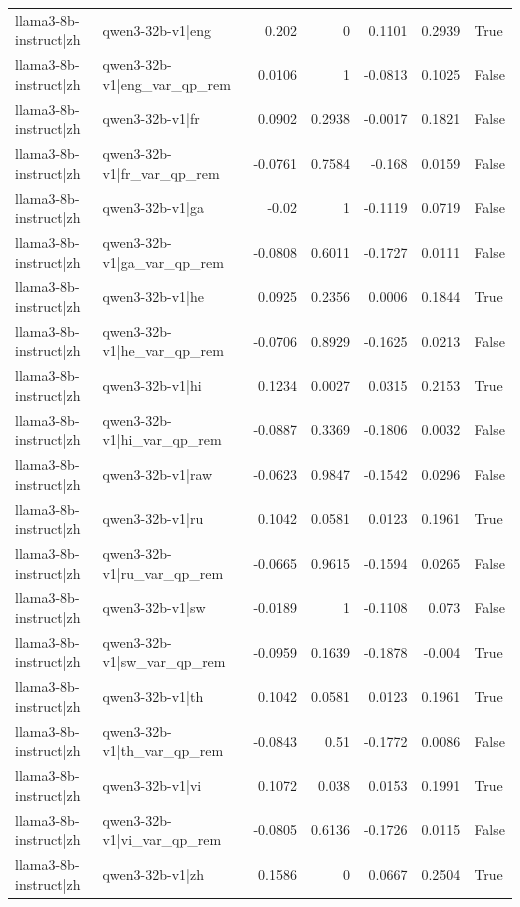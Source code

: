 \begin{table}
\begin{tabular}{l l r r r r l}
llama3-8b-instruct|zh & qwen3-32b-v1|eng & 0.202 & 0 & 0.1101 & 0.2939 & True \\
llama3-8b-instruct|zh & qwen3-32b-v1|eng_var_qp_rem & 0.0106 & 1 & -0.0813 & 0.1025 & False \\
llama3-8b-instruct|zh & qwen3-32b-v1|fr & 0.0902 & 0.2938 & -0.0017 & 0.1821 & False \\
llama3-8b-instruct|zh & qwen3-32b-v1|fr_var_qp_rem & -0.0761 & 0.7584 & -0.168 & 0.0159 & False \\
llama3-8b-instruct|zh & qwen3-32b-v1|ga & -0.02 & 1 & -0.1119 & 0.0719 & False \\
llama3-8b-instruct|zh & qwen3-32b-v1|ga_var_qp_rem & -0.0808 & 0.6011 & -0.1727 & 0.0111 & False \\
llama3-8b-instruct|zh & qwen3-32b-v1|he & 0.0925 & 0.2356 & 0.0006 & 0.1844 & True \\
llama3-8b-instruct|zh & qwen3-32b-v1|he_var_qp_rem & -0.0706 & 0.8929 & -0.1625 & 0.0213 & False \\
llama3-8b-instruct|zh & qwen3-32b-v1|hi & 0.1234 & 0.0027 & 0.0315 & 0.2153 & True \\
llama3-8b-instruct|zh & qwen3-32b-v1|hi_var_qp_rem & -0.0887 & 0.3369 & -0.1806 & 0.0032 & False \\
llama3-8b-instruct|zh & qwen3-32b-v1|raw & -0.0623 & 0.9847 & -0.1542 & 0.0296 & False \\
llama3-8b-instruct|zh & qwen3-32b-v1|ru & 0.1042 & 0.0581 & 0.0123 & 0.1961 & True \\
llama3-8b-instruct|zh & qwen3-32b-v1|ru_var_qp_rem & -0.0665 & 0.9615 & -0.1594 & 0.0265 & False \\
llama3-8b-instruct|zh & qwen3-32b-v1|sw & -0.0189 & 1 & -0.1108 & 0.073 & False \\
llama3-8b-instruct|zh & qwen3-32b-v1|sw_var_qp_rem & -0.0959 & 0.1639 & -0.1878 & -0.004 & True \\
llama3-8b-instruct|zh & qwen3-32b-v1|th & 0.1042 & 0.0581 & 0.0123 & 0.1961 & True \\
llama3-8b-instruct|zh & qwen3-32b-v1|th_var_qp_rem & -0.0843 & 0.51 & -0.1772 & 0.0086 & False \\
llama3-8b-instruct|zh & qwen3-32b-v1|vi & 0.1072 & 0.038 & 0.0153 & 0.1991 & True \\
llama3-8b-instruct|zh & qwen3-32b-v1|vi_var_qp_rem & -0.0805 & 0.6136 & -0.1726 & 0.0115 & False \\
llama3-8b-instruct|zh & qwen3-32b-v1|zh & 0.1586 & 0 & 0.0667 & 0.2504 & True \\

\end{tabular}
\end{table}

